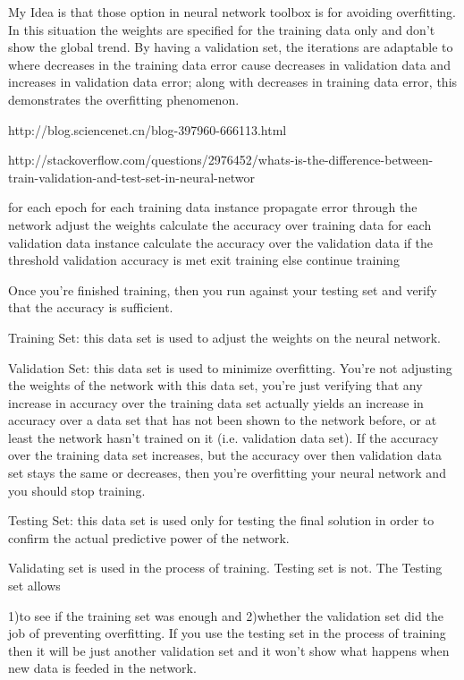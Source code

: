 \documentclass[10pt,a4paper]{ctexbook}
\begin{document}
My Idea is that those option in neural network toolbox is for avoiding overfitting. In this situation the weights are specified for the training data only and don't show the global trend. By having a validation set, the iterations are adaptable to where decreases in the training data error cause decreases in validation data and increases in validation data error; along with decreases in training data error, this demonstrates the overfitting phenomenon.

http://blog.sciencenet.cn/blog-397960-666113.html

http://stackoverflow.com/questions/2976452/whats-is-the-difference-between-train-validation-and-test-set-in-neural-networ

for each epoch
for each training data instance
propagate error through the network
adjust the weights
calculate the accuracy over training data
for each validation data instance
calculate the accuracy over the validation data
if the threshold validation accuracy is met
exit training
else
continue training

Once you're finished training, then you run against your testing set and verify that the accuracy is sufficient.

Training Set: this data set is used to adjust the weights on the neural network.

Validation Set: this data set is used to minimize overfitting. You're not adjusting the weights of the network with this data set, you're just verifying that any increase in accuracy over the training data set actually yields an increase in accuracy over a data set that has not been shown to the network before, or at least the network hasn't trained on it (i.e. validation data set). If the accuracy over the training data set increases, but the accuracy over then validation data set stays the same or decreases, then you're overfitting your neural network and you should stop training.

Testing Set: this data set is used only for testing the final solution in order to confirm the actual predictive power of the network.

Validating set is used in the process of training. Testing set is not. The Testing set allows

1)to see if the training set was enough and 
2)whether the validation set did the job of preventing overfitting. If you use the testing set in the process of training then it will be just another validation set and it won't show what happens when new data is feeded in the network.
\end{document}
